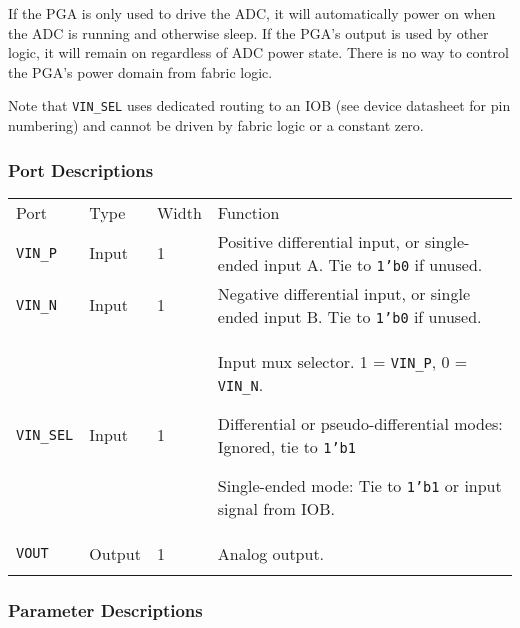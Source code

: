 \documentclass[11pt]{article}
\newcommand{\tokenstyle}[1]{\texttt{#1}}
\newcommand{\datastyle}[1]{\texttt{#1}}
\newcommand{\whenstyle}[1]{{\fontseries{sb}\selectfont#1}}
\newcommand{\thinhline}{\Xhline{1\arrayrulewidth}}
\newcommand{\thickhline}{\Xhline{2.5\arrayrulewidth}}
\newcommand{\novspace}{\vspace*{-\baselineskip}}
\begin{document}
If the PGA is only used to drive the ADC, it will automatically power on when the ADC is running and otherwise sleep.
If the PGA's output is used by other logic, it will remain on regardless of ADC power state. There is no way to control
the PGA's power domain from fabric logic.

Note that \tokenstyle{VIN\_SEL} uses dedicated routing to an IOB (see device datasheet for pin numbering) and cannot be driven
by fabric logic or a constant zero.

\subsubsection{Port Descriptions}

\begin{tabularx}{\textwidth}{lllX}
\thinhline
\whenstyle{Port} & \whenstyle{Type} & \whenstyle{Width} & \whenstyle{Function} \\
\thickhline
\tokenstyle{VIN\_P} & Input & 1 & Positive differential input, or single-ended input A. Tie to \datastyle{1'b0} if unused.\\
\thinhline
\tokenstyle{VIN\_N} & Input & 1 & Negative differential input, or single ended input B. Tie to \datastyle{1'b0} if unused.\\
\thinhline
\tokenstyle{VIN\_SEL} & Input & 1 & Input mux selector. 1 = \tokenstyle{VIN\_P}, 0 = \tokenstyle{VIN\_N}.
	\begin{compactitem}
		\item Differential or pseudo-differential modes: Ignored, tie to \datastyle{1'b1}
		\item Single-ended mode: Tie to \datastyle{1'b1} or input signal from IOB.\novspace
	\end{compactitem}\\
\thinhline
\tokenstyle{VOUT} & Output & 1 & Analog output. \\
\thinhline
\end{tabularx}

\subsubsection{Parameter Descriptions}
\end{document}
